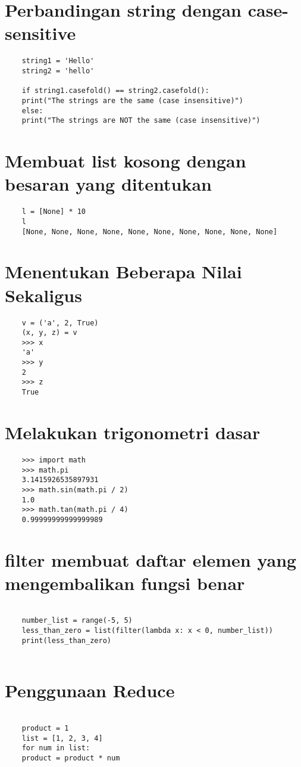 \documentclass[12pt]{article} %
\begin{document}
\section {Perbandingan string dengan case-sensitive}
\begin{lstlisting}
	string1 = 'Hello'
	string2 = 'hello'
	
	if string1.casefold() == string2.casefold():
	print("The strings are the same (case insensitive)")
	else:
	print("The strings are NOT the same (case insensitive)")
\end{lstlisting}

\section {Membuat list kosong dengan besaran yang ditentukan}
\begin{lstlisting}
	l = [None] * 10
	l
	[None, None, None, None, None, None, None, None, None, None]
\end{lstlisting}

\section {Menentukan Beberapa Nilai Sekaligus}
\begin{lstlisting}
	v = ('a', 2, True)
	(x, y, z) = v
	>>> x
	'a'
	>>> y
	2
	>>> z
	True
\end{lstlisting}

\section {Melakukan trigonometri dasar}
\begin{lstlisting}
	>>> import math
	>>> math.pi
	3.1415926535897931
	>>> math.sin(math.pi / 2) 
	1.0
	>>> math.tan(math.pi / 4) 
	0.99999999999999989
\end{lstlisting}

\section {filter membuat daftar elemen yang mengembalikan fungsi
	benar}
\begin{lstlisting}
	
	number_list = range(-5, 5)
	less_than_zero = list(filter(lambda x: x < 0, number_list))
	print(less_than_zero)
	
\end{lstlisting}

\section {Penggunaan Reduce }
\begin{lstlisting}
	
	product = 1
	list = [1, 2, 3, 4]
	for num in list:
	product = product * num
\end{lstlisting}
\end{document}
